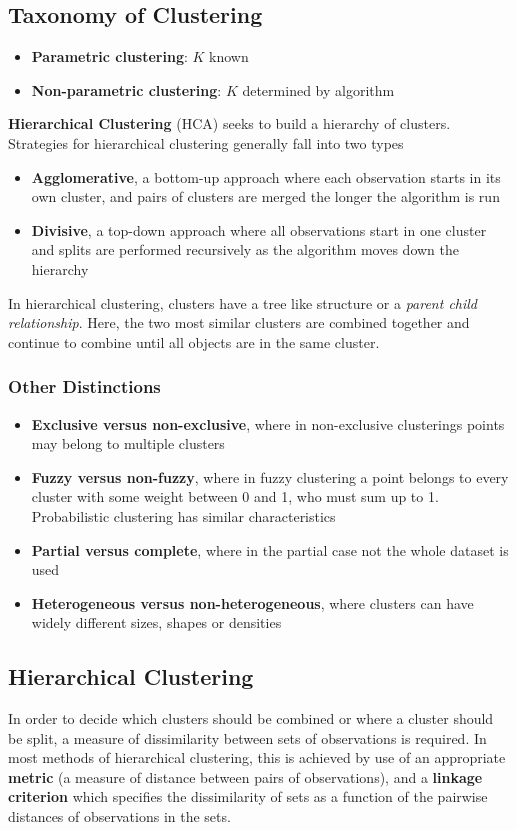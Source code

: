 \documentclass[11pt]{article}
\theoremstyle{definition}
\begin{document}
\subsection{Taxonomy of Clustering}
\begin{itemize}
	\item \textbf{Parametric clustering}: $K$ known
	\item \textbf{Non-parametric clustering}: $K$ determined by algorithm
\end{itemize}
\textbf{Hierarchical Clustering} (HCA) seeks to build a hierarchy of clusters. Strategies for hierarchical clustering generally fall into two types
\begin{itemize}
	\item \textbf{Agglomerative}, a bottom-up approach where each observation starts in its own cluster, and pairs of clusters are merged the longer the algorithm is run
	\item \textbf{Divisive}, a top-down approach where all observations start in one cluster and splits are performed recursively as the algorithm moves down the hierarchy
\end{itemize}
In hierarchical clustering, clusters have a tree like structure or a \emph{parent child relationship}. Here, the two most similar clusters are combined together and continue to combine until all objects are in the same cluster.

\subsubsection{Other Distinctions}
\begin{itemize}
	\item \textbf{Exclusive versus non-exclusive}, where in non-exclusive clusterings points may belong to multiple clusters
	\item \textbf{Fuzzy versus non-fuzzy}, where in fuzzy clustering a point belongs to every cluster with some weight between 0 and 1, who must sum up to 1. Probabilistic clustering has similar characteristics
	\item \textbf{Partial versus complete}, where in the partial case not the whole dataset is used
	\item \textbf{Heterogeneous versus non-heterogeneous}, where clusters can have widely different sizes, shapes or densities
\end{itemize}

\subsection{Hierarchical Clustering}
In order to decide which clusters should be combined or where a cluster should be split, a measure of dissimilarity between sets of observations is required. In most methods of hierarchical clustering, this is achieved by use of an appropriate \textbf{metric} (a measure of distance between pairs of observations), and a \textbf{linkage criterion} which specifies the dissimilarity of sets as a function of the pairwise distances of observations in the sets.
\end{document}
